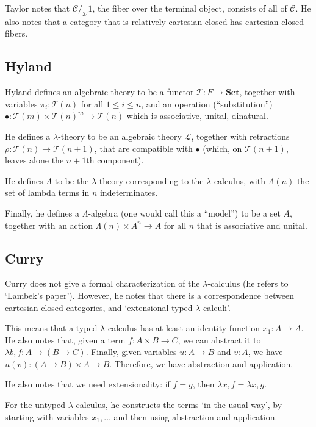 \documentclass{amsbook}
\newcommand{\Catc}[1]{\mathcal{#1}}
\newcommand{\CC}{\Catc{C}}
\newcommand{\Catb}[1]{\mathbf{#1}}
\newcommand{\SET}{\Catb{Set}}
\theoremstyle{definition}
\begin{document}
  Taylor notes that $ \CC /_{\mathcal D} 1 $, the fiber over the terminal object, consists of all of $ \CC $. He also notes that a category that is relatively cartesian closed has cartesian closed fibers.

  \subsection{Hyland}
  Hyland defines an algebraic theory to be a functor $ \mathcal T: F \rightarrow \SET $, together with variables $ \pi_i : \mathcal T(n) $ for all $ 1 \leq i \leq n $, and an operation (``substitution'') $ \bullet: \mathcal T(m) \times \mathcal T(n)^m \to \mathcal T(n) $ which is associative, unital, dinatural.

  He defines a $ \lambda $-theory to be an algebraic theory $ \mathcal L $, together with retractions $ \rho: \mathcal T(n) \to \mathcal T(n + 1) $, that are compatible with $ \bullet $ (which, on $ \mathcal T(n + 1) $, leaves alone the $ n + 1 $th component).

  He defines $ \Lambda $ to be the $ \lambda $-theory corresponding to the $ \lambda $-calculus, with $ \Lambda(n) $ the set of lambda terms in $ n $ indeterminates.

  Finally, he defines a $ \Lambda $-algebra (one would call this a ``model'') to be a set $ A $, together with an action $ \mathcal \Lambda(n) \times A^n \to A $ for all $ n $ that is associative and unital.

  \subsection{Curry}

  Curry does not give a formal characterization of the $ \lambda $-calculus (he refers to `Lambek's paper'). However, he notes that there is a correspondence between cartesian closed categories, and `extensional typed $ \lambda $-calculi'.

  This means that a typed $ \lambda $-calculus has at least an identity function $ x_1: A \to A $. He also notes that, given a term $ f: A \times B \to C $, we can abstract it to $ \lambda b, f: A \to (B \to C) $. Finally, given variables $ u: A \to B $ and $ v: A $, we have $ u (v): (A \to B) \times A \to B $. Therefore, we have abstraction and application.

  He also notes that we need extensionality: if $ f = g $, then $ \lambda x, f = \lambda x, g $.

  For the untyped $ \lambda $-calculus, he constructs the terms `in the usual way', by starting with variables $ x_1, \dots $ and then using abstraction and application.
\end{document}
